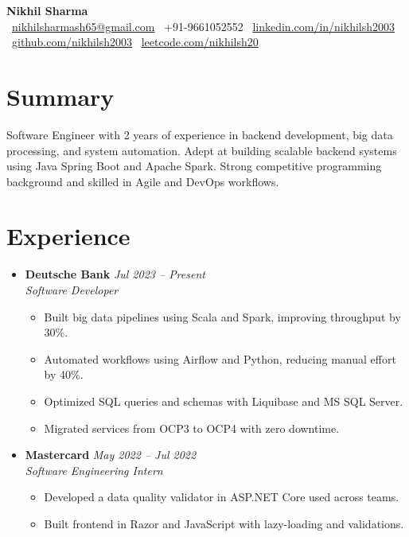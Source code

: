 \documentclass[a4paper,10pt]{article}
\begin{document}
\begin{center}
  {\Huge \textbf{Nikhil Sharma}} \\
  \vspace{6pt}
  \small
  \faEnvelope\ \href{mailto:nikhilsharmash65@gmail.com}{nikhilsharmash65@gmail.com} \hspace{1.5em}
  \faMobile\ +91-9661052552 \hspace{1.5em}
  \faLinkedin\ \href{https://www.linkedin.com/in/nikhilsh2003/}{linkedin.com/in/nikhilsh2003} \hspace{1.5em}
  \faGithub\ \href{https://github.com/nikhilsh2003}{github.com/nikhilsh2003} \hspace{1.5em}
  \faCode\ \href{https://leetcode.com/nikhilsh20}{leetcode.com/nikhilsh20}
\end{center}

\vspace{0.5em}

\section*{Summary}
Software Engineer with 2 years of experience in backend development, big data processing, and system automation. Adept at building scalable backend systems using Java Spring Boot and Apache Spark. Strong competitive programming background and skilled in Agile and DevOps workflows.

\section*{Experience}
\begin{itemize}[leftmargin=0.3in]
  \item \textbf{Deutsche Bank} \hfill \textit{Jul 2023 -- Present} \\
  \textit{Software Developer}
  \begin{itemize}
    \item Built big data pipelines using Scala and Spark, improving throughput by 30\%.
    \item Automated workflows using Airflow and Python, reducing manual effort by 40\%.
    \item Optimized SQL queries and schemas with Liquibase and MS SQL Server.
    \item Migrated services from OCP3 to OCP4 with zero downtime.
  \end{itemize}

  \item \textbf{Mastercard} \hfill \textit{May 2022 -- Jul 2022} \\
  \textit{Software Engineering Intern}
  \begin{itemize}
    \item Developed a data quality validator in ASP.NET Core used across teams.
    \item Built frontend in Razor and JavaScript with lazy-loading and validations.
  \end{itemize}
\end{itemize}
\end{document}
